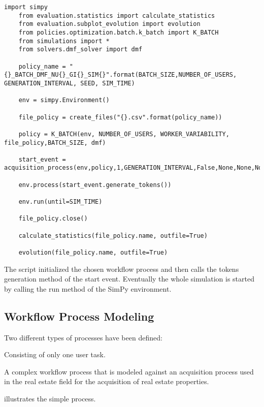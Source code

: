 \documentclass{seal_thesis}
\begin{document}
\begin{lstlisting}[caption=Example of the structure of a simulation script. Here for the K-Batch policy using the \gls{dmf} solver,label=lst:simulation_script,style=CustomPython]
	import simpy
	from evaluation.statistics import calculate_statistics
	from evaluation.subplot_evolution import evolution
	from policies.optimization.batch.k_batch import K_BATCH
	from simulations import *
	from solvers.dmf_solver import dmf

	policy_name = "{}_BATCH_DMF_NU{}_GI{}_SIM{}".format(BATCH_SIZE,NUMBER_OF_USERS, GENERATION_INTERVAL, SEED, SIM_TIME)

	env = simpy.Environment()

	file_policy = create_files("{}.csv".format(policy_name))

	policy = K_BATCH(env, NUMBER_OF_USERS, WORKER_VARIABILITY, file_policy,BATCH_SIZE, dmf)

	start_event = acquisition_process(env,policy,1,GENERATION_INTERVAL,False,None,None,None)

	env.process(start_event.generate_tokens())

	env.run(until=SIM_TIME)

	file_policy.close()

	calculate_statistics(file_policy.name, outfile=True)

	evolution(file_policy.name, outfile=True)
\end{lstlisting}

The script initialized the chosen workflow process and then calls the tokens generation method of the start event. Eventually the whole simulation is started by calling the run method of the SimPy environment.

\subsection{Workflow Process Modeling}

Two different types of processes have been defined:
\begin{enumerate*}
	\item Consisting of only one user task.
	\item A complex workflow process that is modeled against an acquisition process used in the real estate field for the acquisition of real estate properties.
\end{enumerate*}

 illustrates the simple process.
\end{document}
